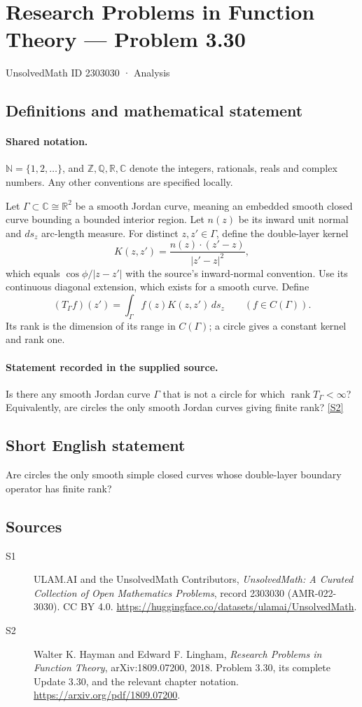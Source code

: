 \documentclass[11pt]{book}
\newcommand{\sref}[2]{\hyperlink{source:#1:#2}{[S#2]}}
\begin{document}
\setcounter{section}{2303029}
\section{Research Problems in Function Theory — Problem 3.30}\label{2303030}
{\small\sffamily UnsolvedMath ID 2303030 · Analysis}
\subsection{Definitions and mathematical statement}

\paragraph{Shared notation.}$\mathbb N=\{1,2,\ldots\}$, and $\mathbb Z,\mathbb Q,\mathbb R,\mathbb C$ denote the integers, rationals, reals and complex numbers. Any other conventions are specified locally.


Let $\Gamma\subset\mathbb C\cong\mathbb R^2$ be a smooth Jordan curve, meaning an embedded smooth closed curve bounding a bounded interior region. Let $n(z)$ be its inward unit normal and $ds_z$ arc-length measure. For distinct $z,z'\in\Gamma$, define the double-layer kernel
\[K(z,z')=\frac{n(z)\cdot(z'-z)}{|z'-z|^2},\]
which equals $\cos\phi/|z-z'|$ with the source's inward-normal convention. Use its continuous diagonal extension, which exists for a smooth curve. Define
\[(T_\Gamma f)(z')=\int_\Gamma f(z)K(z,z')\,ds_z\qquad(f\in C(\Gamma)).\]
Its rank is the dimension of its range in $C(\Gamma)$; a circle gives a constant kernel and rank one.
\paragraph{Statement recorded in the supplied source.}
Is there any smooth Jordan curve $\Gamma$ that is not a circle for which $\operatorname{rank}T_\Gamma<\infty$? Equivalently, are circles the only smooth Jordan curves giving finite rank? \sref{2303030}{2}
\subsection{Short English statement}
Are circles the only smooth simple closed curves whose double-layer boundary operator has finite rank?
\subsection{Sources}
\begin{description}
\item[\hypertarget{source:2303030:1}{S1}] ULAM.AI and the UnsolvedMath Contributors, \emph{UnsolvedMath: A Curated Collection of Open Mathematics Problems}, record 2303030 (AMR-022-3030). CC BY 4.0. \url{https://huggingface.co/datasets/ulamai/UnsolvedMath}.
\item[\hypertarget{source:2303030:2}{S2}] Walter K. Hayman and Edward F. Lingham, \emph{Research Problems in Function Theory}, arXiv:1809.07200, 2018. Problem 3.30, its complete Update 3.30, and the relevant chapter notation. \url{https://arxiv.org/pdf/1809.07200}.
\end{description}
\label{end:2303030}
\end{document}
